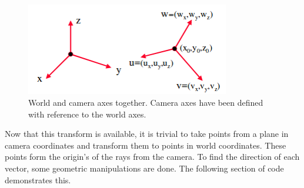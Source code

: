 \documentclass{article}
\begin{document}
\begin{figure}[!b]
\centering
\includegraphics[width=3.5in]{./imgs/axes}
\caption{World and camera axes together. Camera axes have been defined with reference to the world axes.}
\label{fig:axes}
\end{figure}

Now that this transform is available, it is trivial to take points from a plane in camera coordinates and transform 
them to points in world coordinates. These points form the origin's of the rays from the camera. To find the direction
of each vector, some geometric manipulations are done. The following section of code demonstrates this.
\end{document}
